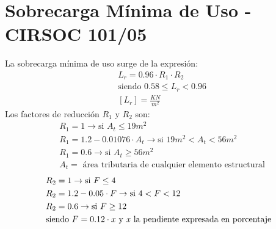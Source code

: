 \section{Sobrecarga Mínima de Uso - CIRSOC 101/05}
 
La sobrecarga mínima de uso surge de la expresión:
\begin{align*}
& L_r = 0.96 \cdot R_1 \cdot R_2 \\
& \text{siendo } 0.58 \leq L_r < 0.96 \\
& [L_r] = \frac{KN}{m^2}
\end{align*}
Los factores de reducción $R_1$ y $R_2$ son:\\
\begin{align*}
& R_1 = 1 \rightarrow \text{si } A_t \leq 19 m^2 \\
& R_1 = 1.2 - 0.01076 \cdot A_t \rightarrow \text{si } 19 m^2 < A_t < 56 m^2\\
& R_1 = 0.6 \rightarrow \text{si } A_t \geq 56 m^2 \\
& A_t = \text{ área tributaria de cualquier elemento estructural}
\end{align*}
\begin{align*}
& R_2 = 1 \rightarrow \text{si } F \leq 4 \\
& R_2 = 1.2 - 0.05 \cdot F \rightarrow \text{si } 4 < F < 12\\
& R_2 = 0.6 \rightarrow \text{si } F \geq 12 \\
& \text{siendo } F = 0.12 \cdot x \text{ y \emph{x} la pendiente expresada en porcentaje}
\end{align*}

